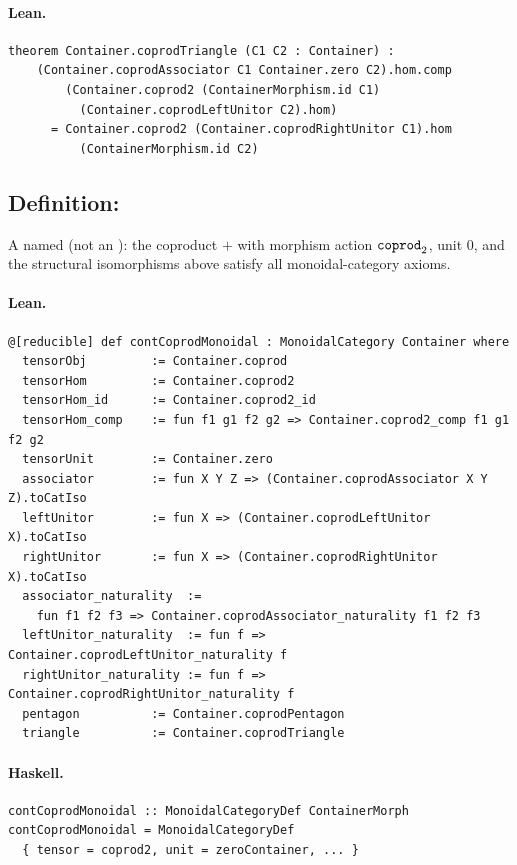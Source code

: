 \documentclass[11pt,a4paper]{article}
\begin{document}
\paragraph{Lean.}
\begin{lstlisting}[style=lean]
theorem Container.coprodTriangle (C1 C2 : Container) :
    (Container.coprodAssociator C1 Container.zero C2).hom.comp
        (Container.coprod2 (ContainerMorphism.id C1)
          (Container.coprodLeftUnitor C2).hom)
      = Container.coprod2 (Container.coprodRightUnitor C1).hom
          (ContainerMorphism.id C2)
\end{lstlisting}


\subsection{Definition: }

\begin{defn}
A named  (not an ): the coproduct $+$ with morphism
action $\texttt{coprod}_2$, unit $0$, and the structural isomorphisms above satisfy
all monoidal-category axioms.
\end{defn}

\paragraph{Lean.}
\begin{lstlisting}[style=lean]
@[reducible] def contCoprodMonoidal : MonoidalCategory Container where
  tensorObj         := Container.coprod
  tensorHom         := Container.coprod2
  tensorHom_id      := Container.coprod2_id
  tensorHom_comp    := fun f1 g1 f2 g2 => Container.coprod2_comp f1 g1 f2 g2
  tensorUnit        := Container.zero
  associator        := fun X Y Z => (Container.coprodAssociator X Y Z).toCatIso
  leftUnitor        := fun X => (Container.coprodLeftUnitor X).toCatIso
  rightUnitor       := fun X => (Container.coprodRightUnitor X).toCatIso
  associator_naturality  :=
    fun f1 f2 f3 => Container.coprodAssociator_naturality f1 f2 f3
  leftUnitor_naturality  := fun f => Container.coprodLeftUnitor_naturality f
  rightUnitor_naturality := fun f => Container.coprodRightUnitor_naturality f
  pentagon          := Container.coprodPentagon
  triangle          := Container.coprodTriangle
\end{lstlisting}

\paragraph{Haskell.}
\begin{lstlisting}[style=haskell]
contCoprodMonoidal :: MonoidalCategoryDef ContainerMorph
contCoprodMonoidal = MonoidalCategoryDef
  { tensor = coprod2, unit = zeroContainer, ... }
\end{lstlisting}
\end{document}
